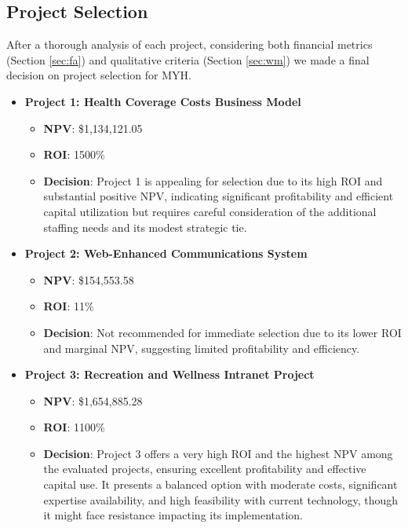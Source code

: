 \subsection{Project Selection}

After a thorough analysis of each project, considering both financial metrics (Section \ref{sec:fa}) and qualitative criteria (Section \ref{sec:wm}) we made a final decision on project selection for MYH.

\begin{itemize}
    \item \textbf{Project 1: Health Coverage Costs Business Model}
    \begin{itemize}
        \item \textbf{NPV}: \$1,134,121.05
        \item \textbf{ROI}: 1500\%
        \item \textbf{Decision}: Project 1 is appealing for selection due to its high ROI and substantial positive NPV, indicating significant profitability and efficient capital utilization but requires careful consideration of the additional staffing needs and its modest strategic tie.
    \end{itemize}

    \item \textbf{Project 2: Web-Enhanced Communications System}
    \begin{itemize}
        \item \textbf{NPV}: \$154,553.58
        \item \textbf{ROI}: 11\%
        \item \textbf{Decision}: Not recommended for immediate selection due to its lower ROI and marginal NPV, suggesting limited profitability and efficiency.
    \end{itemize}

    \item \textbf{Project 3: Recreation and Wellness Intranet Project}
    \begin{itemize}
        \item \textbf{NPV}: \$1,654,885.28
        \item \textbf{ROI}: 1100\%
        \item \textbf{Decision}: Project 3 offers a very high ROI and the highest NPV among the evaluated projects, ensuring excellent profitability and effective capital use. It presents a balanced option with moderate costs, significant expertise availability, and high feasibility with current technology, though it might face resistance impacting its implementation.
    \end{itemize}
\end{itemize}


